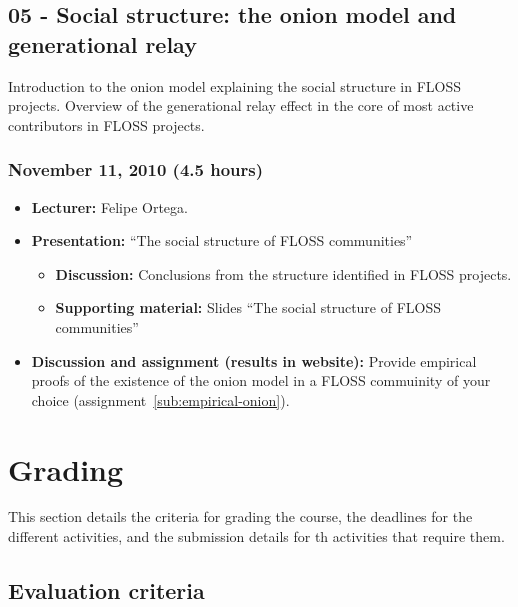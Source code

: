 \documentclass[a4paper]{article}
\begin{document}
\subsection{05 - Social structure: the onion model and generational relay}

Introduction to the onion model explaining the social structure in FLOSS projects. Overview of the generational relay effect in the core of most active contributors in FLOSS projects.

\subsubsection{November 11, 2010 (4.5 hours)}

\begin{itemize}
\item \textbf{Lecturer:} Felipe Ortega.
\item \textbf{Presentation:} ``The social structure of FLOSS communities''
  \begin{itemize}
  \item \textbf{Discussion:} Conclusions from the structure identified in FLOSS projects.
  \item \textbf{Supporting material:} Slides ``The social structure of FLOSS communities''
  \end{itemize}
\item \textbf{Discussion and assignment (results in website):} Provide empirical proofs of the existence of the onion model in a FLOSS commuinity of your choice (assignment~\ref{sub:empirical-onion}).

\end{itemize}

\section{Grading}

This section details the criteria for grading the course, the deadlines for the different activities, and the submission details for th activities that require them.

\subsection{Evaluation criteria}
\label{sub:evaluation-criteria}
\end{document}
